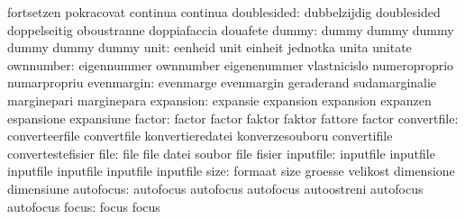                            fortsetzen                pokracovat
                           continua                  continua
              doublesided: dubbelzijdig              doublesided
                           doppelseitig              oboustranne
                           doppiafaccia              douafete
                    dummy: dummy                     dummy
                           dummy                     dummy
                           dummy                     dummy
                     unit: eenheid                   unit
                           einheit                   jednotka
                           unita                     unitate
                ownnumber: eigennummer               ownnumber
                           eigenenummer              vlastnicislo
                           numeroproprio             numarpropriu
               evenmargin: evenmarge                 evenmargin
                           geraderand                sudamarginalie
                           marginepari               marginepara
                expansion: expansie                  expansion
                           expansion                 expanzen
                           espansione                expansiune
                   factor: factor                    factor
                           faktor                    faktor
                           fattore                   factor
              convertfile: converteerfile            convertfile
                           konvertieredatei          konverzesouboru
                           convertifile              convertestefisier
                     file: file                      file
                           datei                     soubor
                           file                      fisier
                inputfile: inputfile                 inputfile
                           inputfile                 inputfile
                           inputfile                 inputfile %
                     size: formaat                   size
                           groesse                   velikost
                           dimensione                dimensiune
                autofocus: autofocus                 autofocus
                           autofocus                 autoostreni
                           autofocus                 autofocus
                    focus: focus                     focus
